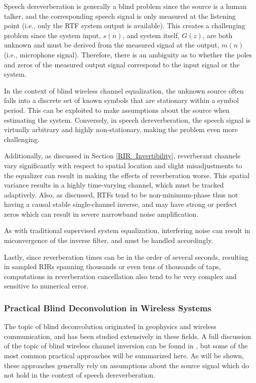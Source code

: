 Speech dereverberation is generally a blind problem since the source is a human talker, and the corresponding speech signal is only measured at the listening point (i.e., only the RTF system output is available). This creates a challenging problem since the system input, $s(n)$, and system itself, $G(z)$, are both unknown and must be derived from the measured signal at the output, $m(n)$ (i.e., microphone signal). Therefore, there is an ambiguity as to whether the poles and zeros of the measured output signal correspond to the input signal or the system.

In the context of blind wireless channel equalization, the unknown source often falls into a discrete set of known symbols that are stationary within a symbol period. This can be exploited to make assumptions about the source when estimating the system. Conversely, in speech dereverberation, the speech signal is virtually arbitrary and highly non-stationary, making the problem even more challenging.

Additionally, as discussed in Section \ref{RIR_Invertibility}, reverberant channels vary significantly with respect to spatial location and slight misadjustments to the equalizer can result in making the effects of reverberation worse. This spatial variance results in a highly time-varying channel, which must be tracked adaptively. Also, as discussed, RTFs tend to be non-minimum-phase thus not having a causal stable single-channel inverse, and may have strong or perfect zeros which can result in severe narrowband noise amplification.

As with traditional supervised system equalization, interfering noise can result in miconvergence of the inverse filter, and must be handled accordingly.

Lastly, since reverberation times can be in the order of several seconds, resulting in sampled RIRs spanning thousands or even tens of thousands of taps, computations in reverberation cancellation also tend to be very complex and sensitive to numerical error.

\subsubsection{Practical Blind Deconvolution in Wireless Systems}

The topic of blind deconvolution originated in geophysics and wireless communication, and has been studied extensively in these fields. A full discussion of the topic of blind wireless channel inversion can be found in \cite{ding2018blind}, but some of the most common practical approaches will be summarized here. As will be shown, these approaches generally rely on assumptions about the source signal which do not hold in the context of speech dereverberation.

